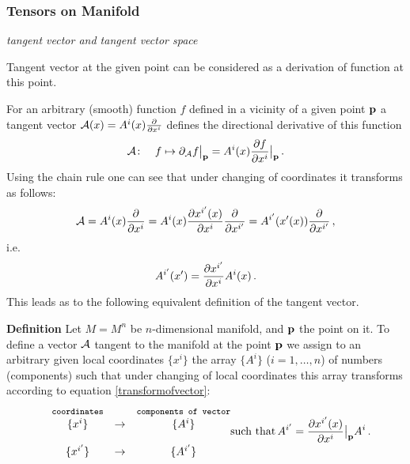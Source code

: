 \documentclass[12pt]{article}
\theoremstyle{theorem}
\numberwithin{equation}{section}
\begin{document}
  \subsubsection{ Tensors on Manifold}\label{tensors}


{\it tangent vector and tangent vector space}

\smallskip

 Tangent vector at the given point
can be considered as a derivation of function at this point.


  For an arbitrary (smooth)
function $f$ defined in a vicinity of a given 
 point ${\bf p}$ a tangent vector ${\cal A}(x)=A^i(x){\partial\over \partial x^i}$
defines the directional derivative of this function 
      \begin{equation*} 
 {\cal A}\colon \quad 
   f \mapsto  \partial_{\cal A} f\big\vert_{\bf p}=A^i(x)
{\partial f\over \partial x^i}\big\vert_{{\bf p}}\,.    
      \end{equation*} 
Using the chain rule 
one can see that
under changing of coordinates 
it transforms as follows: 
             $$
         {\cal A}=A^i(x){\partial\over \partial x^i}=
A^i(x){\partial x^{i'}(x)\over \partial x^i}{\partial\over \partial x^{i'}}=
         A^{i'}(x'(x)){\partial\over \partial x^{i'}}\,,
             $$
i.e.
            \begin{equation}\label{transformofvector}
                   A^{i'}(x')={\partial x^{i'}\over \partial x^i}A^i(x)\,.
            \end{equation}
     This leads as to the following equivalent definition
of the tangent vector.

\smallskip

{\bf Definition}   Let $M=M^n$ be $n$-dimensional
manifold, and ${\bf p}$ the point on it.
To define a  vector ${\cal A}$ tangent to the 
manifold  at the point ${\bf p}$
we assign to an
arbitrary   
given local coordinates $\{x^i\}$
the array $\{A^i\}$ ($i=1,\dots,n$)
of numbers (components) 
such that under changing of local coordinates
this array  transforms  according to equation
\eqref{transformofvector}: 
         \begin{equation}\label{definitionofvector}
  \begin{matrix}
&\hbox{{\tt {\footnotesize coordinates}}}
 &            
&\hbox{{\tt {\footnotesize components of vector}}}\cr
&\{x^i\}   &\rightarrow
     &   \{A^i\}\cr
 &&&\cr
&\{x^{i'}\}   &\rightarrow
     &   \{A^{i'}\}\cr
      \end{matrix}\hbox{such that}\, 
      A^{i'}=
{\partial x^{i'}(x)\over \partial x^i}\big\vert_{\bf p}  A^i\,.  
        \end{equation}
\end{document}
